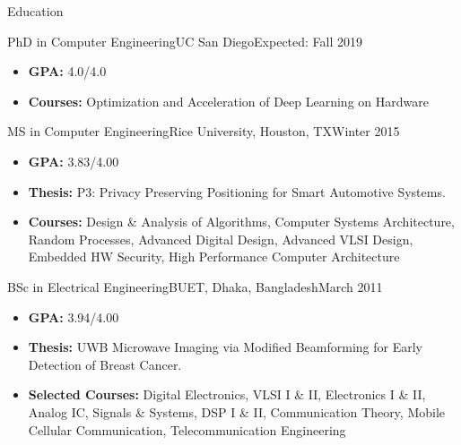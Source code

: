 \begin{cvsection}{Education}
	\begin{cvsubsection}{PhD in Computer Engineering}{UC San Diego}{Expected: Fall 2019}
		\begin{itemize}
			\item \textbf{GPA:} 4.0/4.0
			\item \textbf{Courses:} Optimization and Acceleration of Deep Learning on Hardware
		\end{itemize}
	\end{cvsubsection}	
	\vspace{-0.3em}
	\begin{cvsubsection}{MS in Computer Engineering}{Rice University, Houston, TX}{Winter 2015}
		\begin{itemize}
			\item \textbf{GPA:} 3.83/4.00
			\item \textbf{Thesis:} P3: Privacy Preserving Positioning for Smart Automotive Systems.
			\item \textbf{Courses:} Design \& Analysis of Algorithms, Computer Systems Architecture, Random Processes, Advanced Digital Design, Advanced VLSI Design, Embedded HW Security, High Performance Computer Architecture
		\end{itemize}
	\end{cvsubsection}
	\vspace{-0.3em}
	\begin{cvsubsection}{BSc in Electrical Engineering}{BUET, Dhaka, Bangladesh}{March 2011}
		\begin{itemize}
			\item \textbf{GPA:} 3.94/4.00
			\item \textbf{Thesis:} UWB Microwave Imaging via Modified Beamforming for Early Detection of Breast Cancer.
			\item \textbf{Selected Courses:} Digital Electronics, VLSI I \& II, Electronics I \& II, Analog IC, Signals \& Systems, DSP I \& II, Communication Theory, Mobile Cellular Communication, Telecommunication Engineering
		\end{itemize}
	\end{cvsubsection}
\end{cvsection}
\vspace{-0.3em}
